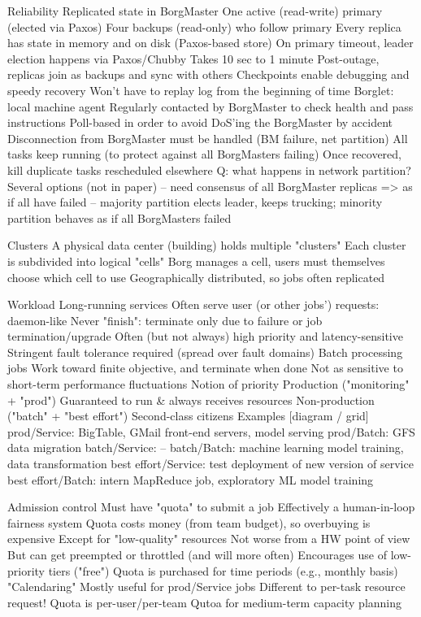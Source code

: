 Reliability
  Replicated state in BorgMaster
    One active (read-write) primary (elected via Paxos)
    Four backups (read-only) who follow primary
      Every replica has state in memory and on disk (Paxos-based store)
    On primary timeout, leader election happens via Paxos/Chubby
      Takes 10 sec to 1 minute
      Post-outage, replicas join as backups and sync with others
    Checkpoints enable debugging and speedy recovery
      Won't have to replay log from the beginning of time
  Borglet: local machine agent
    Regularly contacted by BorgMaster to check health and pass instructions
      Poll-based in order to avoid DoS'ing the BorgMaster by accident
    Disconnection from BorgMaster must be handled (BM failure, net partition)
      All tasks keep running (to protect against all BorgMasters failing)
      Once recovered, kill duplicate tasks rescheduled elsewhere
  Q: what happens in network partition? Several options (not in paper)
     -- need consensus of all BorgMaster replicas => as if all have failed
     -- majority partition elects leader, keeps trucking; minority partition
        behaves as if all BorgMasters failed

Clusters
  A physical data center (building) holds multiple "clusters"
  Each cluster is subdivided into logical "cells"
  Borg manages a cell, users must themselves choose which cell to use
    Geographically distributed, so jobs often replicated

Workload
  Long-running services
    Often serve user (or other jobs') requests: daemon-like
    Never "finish": terminate only due to failure or job termination/upgrade
    Often (but not always) high priority and latency-sensitive
    Stringent fault tolerance required (spread over fault domains)
  Batch processing jobs
    Work toward finite objective, and terminate when done
    Not as sensitive to short-term performance fluctuations
  Notion of priority
    Production ("monitoring" + "prod")
      Guaranteed to run & always receives resources
    Non-production ("batch" + "best effort")
      Second-class citizens
  Examples [diagram / grid]
    prod/Service: BigTable, GMail front-end servers, model serving
    prod/Batch: GFS data migration
    batch/Service: --
    batch/Batch: machine learning model training, data transformation
    best effort/Service: test deployment of new version of service
    best effort/Batch: intern MapReduce job, exploratory ML model training

Admission control
  Must have "quota" to submit a job
  Effectively a human-in-loop fairness system
  Quota costs money (from team budget), so overbuying is expensive
    Except for "low-quality" resources
      Not worse from a HW point of view
      But can get preempted or throttled (and will more often)
    Encourages use of low-priority tiers ("free")
  Quota is purchased for time periods (e.g., monthly basis)
    "Calendaring"
    Mostly useful for prod/Service jobs
  Different to per-task resource request!
    Quota is per-user/per-team
    Qutoa for medium-term capacity planning


